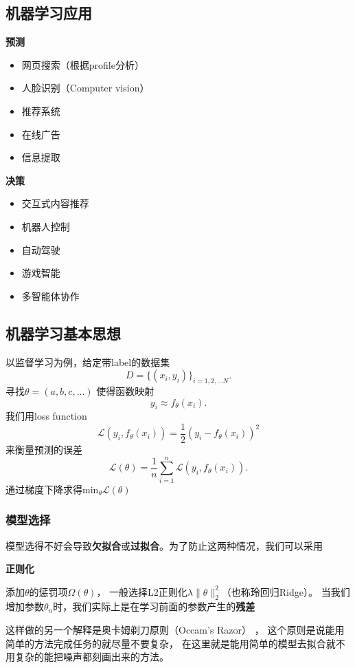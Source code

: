 \subsection{机器学习应用}
\noindent \textbf{预测}
\begin{itemize}
		\item 网页搜索（根据profile分析）
		\item 人脸识别（Computer vision）
		\item 推荐系统
		\item 在线广告
		\item 信息提取
\end{itemize}
\noindent \textbf{决策}
\begin{itemize}
		\item 交互式内容推荐
		\item 机器人控制
		\item 自动驾驶
		\item 游戏智能		
		\item 多智能体协作
\end{itemize}

\subsection{机器学习基本思想}
	以监督学习为例，给定带label的数据集
	 \[
			 D = \{\left( x_{i},y_{i} \right) \}_{i=1,2,\ldots N} 
	.\] 
	寻找$\theta=\left( a,b,c,\ldots \right) $ 使得函数映射
	\[
			y_{i} \approx f_{\theta} \left( x_{i} \right) 
	.\] 
	我们用loss function 
	\[ 
			\mathcal{L}\left( y_{i},f_{\theta}\left( x_{i} \right)  \right) =\frac{1}{2}\left( y_{i}-f_{\theta}\left( x_{i} \right)  \right)^2  
	\]
	来衡量预测的误差
	\[
			\mathcal{L}\left( \theta \right)  = 
			\frac{1}{n} \sum_{i=1}^{n} \mathcal{L}\left( y_{i},f_{\theta}\left( x_{i} \right)  \right) 
	.\] 
	通过梯度下降求得$ \mathrm{min}_{\theta}  \mathcal{L}\left( \theta \right) $

	\subsubsection{模型选择}
	模型选得不好会导致\textbf{欠拟合}或\textbf{过拟合}。为了防止这两种情况，我们可以采用
	
\noindent \textbf{正则化}

	添加$\theta$的惩罚项$\Omega\left( \theta \right)$， 一般选择L2正则化$\lambda \|\theta\|^2_{2}$（也称玲回归Ridge）。
	当我们增加参数$\theta_n$时，我们实际上是在学习前面的参数产生的\textbf{残差}

	这样做的另一个解释是奥卡姆剃刀原则（Occam’s Razor） ，
	这个原则是说能用简单的方法完成任务的就尽量不要复杂，
	在这里就是能用简单的模型去拟合就不用复杂的能把噪声都刻画出来的方法。

